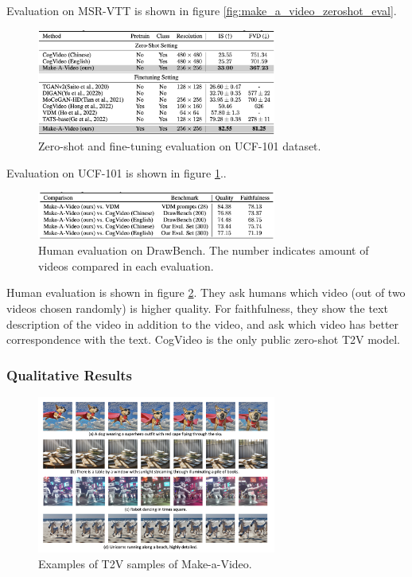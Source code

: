 Evaluation on MSR-VTT is shown in figure \ref{fig:make_a_video_zeroshot_eval}.

\begin{figure}[h]
    \centering
    \includegraphics[width=0.7\textwidth]{images/make_a_video/ucf_101.png}
    \caption{Zero-shot and fine-tuning evaluation on UCF-101 dataset.}
    \label{fig:make_a_video_ucf_101}
\end{figure}

Evaluation on UCF-101 is shown in figure \ref{fig:make_a_video_ucf_101}..

\begin{figure}[h]
    \centering
    \includegraphics[width=0.7\textwidth]{images/make_a_video/eval.png}
    \caption{Human evaluation on DrawBench. The number indicates amount of videos compared in each evaluation.}
    \label{fig:make_a_video_human_eval}
\end{figure}

Human evaluation is shown in figure \ref{fig:make_a_video_human_eval}. They ask humans which video (out of two videos chosen randomly) is higher quality. For faithfulness, they show the text description of the video in addition to the video, and ask which video has better correspondence with the text. CogVideo is the only public zero-shot T2V model.



\subsubsection{Qualitative Results}

\begin{figure}
    \centering
    \includegraphics[width=0.7\textwidth]{images/make_a_video/examples.png}
    \caption{Examples of T2V samples of Make-a-Video.}
    \label{fig:make_a_video_examples}
\end{figure}

